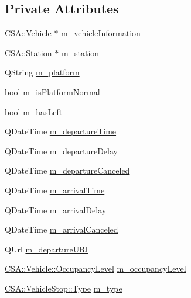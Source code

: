 \subsection*{Private Attributes}
\begin{DoxyCompactItemize}
\item 
\mbox{\hyperlink{classCSA_1_1Vehicle}{C\+S\+A\+::\+Vehicle}} $\ast$ \mbox{\hyperlink{classCSA_1_1VehicleStop_adb8e903136887bad1106057bea070849}{m\+\_\+vehicle\+Information}}
\item 
\mbox{\hyperlink{classCSA_1_1Station}{C\+S\+A\+::\+Station}} $\ast$ \mbox{\hyperlink{classCSA_1_1VehicleStop_a9c9d4bf0d0afb8d354cf1a462018848a}{m\+\_\+station}}
\item 
Q\+String \mbox{\hyperlink{classCSA_1_1VehicleStop_ab8838a2e66e088cb22697429f42fb095}{m\+\_\+platform}}
\item 
bool \mbox{\hyperlink{classCSA_1_1VehicleStop_a80917f349cb1f69d6b45bec5a3ed1348}{m\+\_\+is\+Platform\+Normal}}
\item 
bool \mbox{\hyperlink{classCSA_1_1VehicleStop_a1ad41c255976580494bdd14e86455bdd}{m\+\_\+has\+Left}}
\item 
Q\+Date\+Time \mbox{\hyperlink{classCSA_1_1VehicleStop_a9454125f6563f6a2141850472f33d546}{m\+\_\+departure\+Time}}
\item 
Q\+Date\+Time \mbox{\hyperlink{classCSA_1_1VehicleStop_accc9b62415d4bbf78cb6516c5eb69547}{m\+\_\+departure\+Delay}}
\item 
Q\+Date\+Time \mbox{\hyperlink{classCSA_1_1VehicleStop_a978fcad0cb055cf1ab030cb44d2cf582}{m\+\_\+departure\+Canceled}}
\item 
Q\+Date\+Time \mbox{\hyperlink{classCSA_1_1VehicleStop_a97c5db58b20c001c2eca1d0360339230}{m\+\_\+arrival\+Time}}
\item 
Q\+Date\+Time \mbox{\hyperlink{classCSA_1_1VehicleStop_a5d372323cdccfdb7fc124f1804afe6d6}{m\+\_\+arrival\+Delay}}
\item 
Q\+Date\+Time \mbox{\hyperlink{classCSA_1_1VehicleStop_a38c286c3c0be82c46956589774ee218f}{m\+\_\+arrival\+Canceled}}
\item 
Q\+Url \mbox{\hyperlink{classCSA_1_1VehicleStop_aec621f0a6ce68e2fa31ddf359e416771}{m\+\_\+departure\+U\+RI}}
\item 
\mbox{\hyperlink{classCSA_1_1Vehicle_a331cc81107e5f0a8f37f894729dd9bda}{C\+S\+A\+::\+Vehicle\+::\+Occupancy\+Level}} \mbox{\hyperlink{classCSA_1_1VehicleStop_acb0674aa6848c6e7b183d9c516210cbb}{m\+\_\+occupancy\+Level}}
\item 
\mbox{\hyperlink{classCSA_1_1VehicleStop_a7c2030d5a49808cb8e6fefaa691a76e0}{C\+S\+A\+::\+Vehicle\+Stop\+::\+Type}} \mbox{\hyperlink{classCSA_1_1VehicleStop_a3a162e84b6ca51f7296d65f542e53f44}{m\+\_\+type}}
\end{DoxyCompactItemize}


